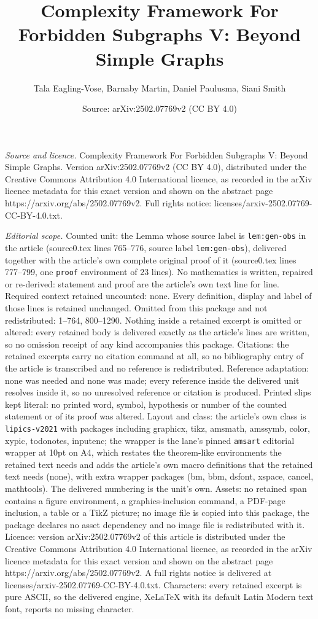 \documentclass[10pt,a4paper]{amsart}
\title[Complexity Framework For Forbidden Subgraphs V: Beyond Simpl]{Complexity Framework For Forbidden Subgraphs V: Beyond Simple Graphs}
\author{Tala Eagling-Vose, Barnaby Martin, Daniel Paulusma, Siani Smith}
\date{Source: arXiv:2502.07769v2 (CC BY 4.0)}
\begin{document}
\maketitle

\noindent\emph{Source and licence.} Complexity Framework For Forbidden Subgraphs V: Beyond Simple Graphs. Version arXiv:2502.07769v2 (CC BY 4.0), distributed under the Creative Commons Attribution 4.0 International licence, as recorded in the arXiv licence metadata for this exact version and shown on the abstract page https://arxiv.org/abs/2502.07769v2. Full rights notice: licenses/arxiv-2502.07769-CC-BY-4.0.txt.\par\smallskip

\noindent\textit{Editorial scope.} Counted unit: the Lemma whose source label is \texttt{lem:gen-obs} in the article (source0.tex lines 765--776, source label \texttt{lem:gen-obs}), delivered together with the article's own complete original proof of it (source0.tex lines 777--799, one \texttt{proof} environment of 23 lines). No mathematics is written, repaired or re-derived: statement and proof are the article's own text line for line. Required context retained uncounted: none. Every definition, display and label of those lines is retained unchanged. Omitted from this package and not redistributed: 1--764, 800--1290. Nothing inside a retained excerpt is omitted or altered: every retained body is delivered exactly as the article's lines are written, so no omission receipt of any kind accompanies this package. Citations: the retained excerpts carry no citation command at all, so no bibliography entry of the article is transcribed and no reference is redistributed. Reference adaptation: none was needed and none was made; every reference inside the delivered unit resolves inside it, so no unresolved reference or citation is produced. Printed slips kept literal: no printed word, symbol, hypothesis or number of the counted statement or of its proof was altered. Layout and class: the article's own class is \texttt{lipics-v2021} with packages including graphicx, tikz, amsmath, amssymb, color, xypic, todonotes, inputenc; the wrapper is the lane's pinned \texttt{amsart} editorial wrapper at 10pt on A4, which restates the theorem-like environments the retained text needs and adds the article's own macro definitions that the retained text needs (none), with extra wrapper packages (bm, bbm, dsfont, xspace, cancel, mathtools). The delivered numbering is the unit's own. Assets: no retained span contains a figure environment, a graphics-inclusion command, a PDF-page inclusion, a table or a TikZ picture; no image file is copied into this package, the package declares no asset dependency and no image file is redistributed with it. Licence: version arXiv:2502.07769v2 of this article is distributed under the Creative Commons Attribution 4.0 International licence, as recorded in the arXiv licence metadata for this exact version and shown on the abstract page https://arxiv.org/abs/2502.07769v2. A full rights notice is delivered at licenses/arxiv-2502.07769-CC-BY-4.0.txt. Characters: every retained excerpt is pure ASCII, so the delivered engine, XeLaTeX with its default Latin Modern text font, reports no missing character.
\end{document}

